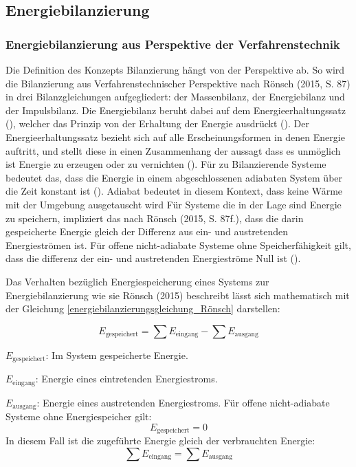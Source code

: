 \subsection{Energiebilanzierung}
\subsubsection{Energiebilanzierung aus Perspektive der Verfahrenstechnik}
Die Definition des Konzepts Bilanzierung hängt von der Perspektive ab. So wird die Bilanzierung aus Verfahrenstechnischer Perspektive nach 
Rönsch (2015, S. 87) in drei Bilanzgleichungen aufgegliedert: der Massenbilanz, der Energiebilanz und der Impulsbilanz.
Die Energiebilanz beruht dabei auf dem Energieerhaltungssatz (\cite[S. 87]{Rönsch.2015}), welcher das Prinzip von der Erhaltung
der Energie ausdrückt (\cite[S. 57]{Baehr.1966}). Der Energieerhaltungssatz bezieht sich auf alle Erscheinungsformen in denen Energie auftritt, 
und stellt diese in einen Zusammenhang der aussagt dass es unmöglich ist Energie zu erzeugen oder zu vernichten (\cite[S. 57]{Baehr.1966}).
Für zu Bilanzierende Systeme bedeutet das, dass die Energie in einem abgeschlossenen adiabaten System über die Zeit 
konstant ist (\cite[S. 87]{Rönsch.2015}). 
Adiabat bedeutet in diesem Kontext, dass keine Wärme mit der Umgebung ausgetauscht wird
Für Systeme die in der Lage sind Energie zu speichern, impliziert das nach Rönsch (2015, S. 87f.), 
dass die darin gespeicherte Energie gleich der Differenz aus ein- und austretenden Energieströmen ist. 
Für offene nicht-adiabate Systeme ohne Speicherfähigkeit gilt, dass die differenz der ein- und austretenden Energieströme Null ist (\cite[S. 87f.]{Rönsch.2015}).

Das Verhalten bezüglich Energiespeicherung eines Systems zur Energiebilanzierung wie sie Rönsch (2015) beschreibt lässt sich mathematisch 
mit der Gleichung \eqref{energiebilanzierungsgleichung_Rönsch} darstellen:

\begin{equation}
E_{\text{gespeichert}} = \sum E_{\text{eingang}} - \sum E_{\text{ausgang}}
\label{energiebilanzierungsgleichung_Rönsch}
\end{equation}

\begin{description}
    \item \(E_{\text{gespeichert}}\): Im System gespeicherte Energie.
    \item \(E_{\text{eingang}}\): Energie eines eintretenden Energiestroms.
    \item \(E_{\text{ausgang}}\): Energie eines austretenden Energiestroms.
    Für offene nicht-adiabate Systeme ohne Energiespeicher gilt:
    \[
    E_{\text{gespeichert}} = 0
    \]
    In diesem Fall ist die zugeführte Energie gleich der verbrauchten Energie:
    \[
    \sum E_{\text{eingang}} = \sum E_{\text{ausgang}}
    \]
\end{description}

